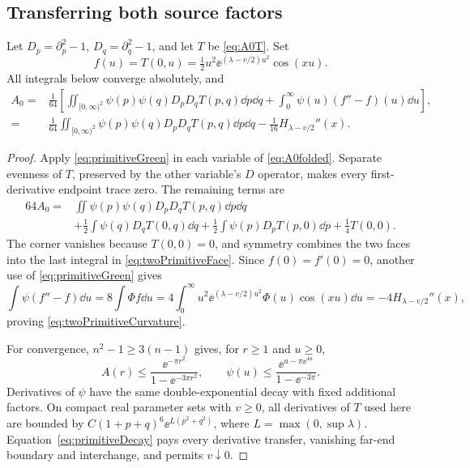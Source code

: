 \subsection{Transferring both source factors}
\begin{theorem}\label{thm:twoPrimitive}
Let $D_p=\partial_p^2-1$, $D_q=\partial_q^2-1$, and let $T$ be
\eqref{eq:A0T}. Set
\begin{equation}\label{eq:primitiveface}
 f(u)=T(0,u)=\tfrac12u^2\ee^{(\lambda-v/2)u^2}\cos(xu).
\end{equation}
All integrals below converge absolutely, and
\begin{align}
 A_0={}&\frac1{64}\left[
  \iint_{[0,\infty)^2}\psi(p)\psi(q)D_pD_qT(p,q)\dd p\dd q
  +\int_0^\infty\psi(u)(f''-f)(u)\dd u\right],
  \label{eq:twoPrimitiveFace}\\
 ={}&\frac1{64}\iint_{[0,\infty)^2}
       \psi(p)\psi(q)D_pD_qT(p,q)\dd p\dd q
       -\frac1{16}H_{\lambda-v/2}''(x).
  \label{eq:twoPrimitiveCurvature}
\end{align}
\end{theorem}
\begin{proof}
Apply \eqref{eq:primitiveGreen} in each variable of \eqref{eq:A0folded}.
Separate evenness of $T$, preserved by the other variable's $D$ operator,
makes every first-derivative endpoint trace zero. The remaining terms are
\begin{align*}
 64A_0={}&\iint\psi(p)\psi(q)D_pD_qT(p,q)\dd p\dd q\\
 &+\tfrac12\int\psi(q)D_qT(0,q)\dd q
  +\tfrac12\int\psi(p)D_pT(p,0)\dd p+\tfrac14T(0,0).
\end{align*}
The corner vanishes because $T(0,0)=0$, and symmetry combines the two
faces into the last integral in \eqref{eq:twoPrimitiveFace}. Since
$f(0)=f'(0)=0$, another use of \eqref{eq:primitiveGreen} gives
\[
 \int\psi(f''-f)\dd u=8\int\Phi f\dd u
 =4\int_0^\infty u^2\ee^{(\lambda-v/2)u^2}\Phi(u)\cos(xu)\dd u
 =-4H_{\lambda-v/2}''(x),
\]
proving \eqref{eq:twoPrimitiveCurvature}.

For convergence, $n^2-1\ge3(n-1)$ gives, for $r\ge1$ and $u\ge0$,
\begin{equation}\label{eq:primitiveDecay}
 A(r)\le\frac{\ee^{-\pi r^2}}{1-\ee^{-3\pi r^2}},\qquad
 \psi(u)\le\frac{\ee^{u-\pi\ee^{4u}}}{1-\ee^{-3\pi}}.
\end{equation}
Derivatives of $\psi$ have the same double-exponential decay with fixed
additional factors. On compact real parameter sets with $v\ge0$, all
derivatives of $T$ used here are bounded by
$C(1+p+q)^6\ee^{L(p^2+q^2)}$, where $L=\max(0,\sup\lambda)$.
Equation~\eqref{eq:primitiveDecay} pays every derivative transfer,
vanishing far-end boundary and interchange, and permits $v\downarrow0$.
\end{proof}

